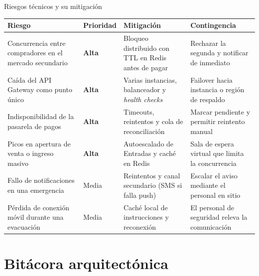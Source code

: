 \documentclass[aspectratio=169,10pt,xcolor={table}]{beamer}
\begin{document}
\begin{frame}{Riesgos técnicos y su mitigación}
  \scriptsize
  \begin{tabular}{L{3.5cm}C{1.5cm}L{3.9cm}L{3.9cm}}
    \toprule
    \textbf{Riesgo} & \textbf{Prioridad} & \textbf{Mitigación} & \textbf{Contingencia} \\
    \midrule
    Concurrencia entre compradores en el mercado secundario & \textbf{Alta} &
      Bloqueo distribuido con TTL en Redis antes de pagar &
      Rechazar la segunda y notificar de inmediato \\
    Caída del API Gateway como punto único & \textbf{Alta} &
      Varias instancias, balanceador y \textit{health checks} &
      Failover hacia instancia o región de respaldo \\
    Indisponibilidad de la pasarela de pagos & \textbf{Alta} &
      Timeouts, reintentos y cola de reconciliación &
      Marcar pendiente y permitir reintento manual \\
    Picos en apertura de venta o ingreso masivo & \textbf{Alta} &
      Autoescalado de Entradas y caché en Redis &
      Sala de espera virtual que limita la concurrencia \\
    Fallo de notificaciones en una emergencia & Media &
      Reintentos y canal secundario (SMS si falla push) &
      Escalar el aviso mediante el personal en sitio \\
    Pérdida de conexión móvil durante una evacuación & Media &
      Caché local de instrucciones y reconexión &
      El personal de seguridad releva la comunicación \\
    \bottomrule
  \end{tabular}
\end{frame}

\section{Bitácora arquitectónica}
\end{document}
